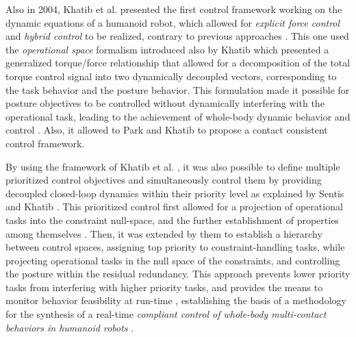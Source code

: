 	Also in 2004, Khatib et al. \cite{Khatib_IJHR2004} presented the first control framework working on the
	dynamic equations of a humanoid robot, which allowed for \emph{explicit force control} and
	\emph{hybrid control} to be realized, contrary to previous approaches \cite{DelPrete_PhDThesis2013}.
	This one used the \emph{operational space} formalism introduced also by Khatib
	\cite{Khatib_RoboticsAuto1987} which presented a generalized torque/force relationship that
	allowed for a	decomposition of the total torque control signal into two dynamically decoupled
	vectors, corresponding to the task behavior and the posture behavior.
	This formulation made it possible for posture objectives to be controlled without dynamically
	interfering with the operational task, leading to the achievement of whole-body dynamic behavior
	and control	\cite{Khatib_IJHR2004}.
	Also, it allowed to Park and Khatib \cite{Park_ICRA2006} \cite{Park_Robotica2008} to propose a contact
	consistent control framework.
		
	By using the framework of Khatib et al. \cite{Khatib_IJHR2004}, it was also possible to define multiple
	prioritized control objectives and simultaneously control them by providing decoupled closed-loop
	dynamics within their	priority level as explained by Sentis and Khatib \cite{Sentis_IJHR2004}
	\cite{Sentis_ICRA2005} \cite{Sentis_IJHR2005}.
	This prioritized control first allowed for a projection of operational tasks into the constraint
	null-space, and the further establishment of properties among themselves \cite{Sentis_IJHR2005}.
	Then, it was extended by them \cite{Sentis_ICRA2006} to establish a hierarchy between control
	spaces,	assigning top priority to	constraint-handling tasks, while projecting operational tasks
	in the null space of the constraints, and controlling the posture	within the residual redundancy.
	This approach prevents lower priority tasks from interfering with higher priority tasks,
	and provides the means to monitor behavior feasibility at run-time \cite{Sentis_ICRA2006},
	establishing the basis of a methodology for the synthesis of a real-time
	\emph{compliant control of whole-body multi-contact behaviors in humanoid robots}
	\cite{Sentis_PhDThesis2007} \cite{Sentis_MotionPlan2010}.
	
